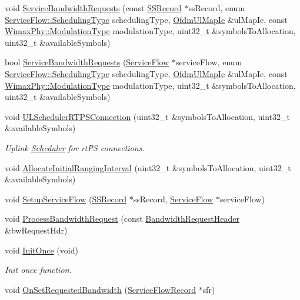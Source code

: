 \begin{DoxyCompactItemize}
\item 
void \hyperlink{classns3_1_1UplinkSchedulerRtps_a35d16645e1db685e5df2b5fc7527f5de}{Service\+Bandwidth\+Requests} (const \hyperlink{classns3_1_1SSRecord}{S\+S\+Record} $\ast$ss\+Record, enum \hyperlink{classns3_1_1ServiceFlow_a7990ba10be1e098328fd1e6382a26235}{Service\+Flow\+::\+Scheduling\+Type} scheduling\+Type, \hyperlink{classns3_1_1OfdmUlMapIe}{Ofdm\+Ul\+Map\+Ie} \&ul\+Map\+Ie, const \hyperlink{classns3_1_1WimaxPhy_a044c5d8a48ca992c39c2a946f6e755fa}{Wimax\+Phy\+::\+Modulation\+Type} modulation\+Type, uint32\+\_\+t \&symbols\+To\+Allocation, uint32\+\_\+t \&available\+Symbols)
\item 
bool \hyperlink{classns3_1_1UplinkSchedulerRtps_a0aa40f551a0bf51ca2197ff85190f572}{Service\+Bandwidth\+Requests} (\hyperlink{classns3_1_1ServiceFlow}{Service\+Flow} $\ast$service\+Flow, enum \hyperlink{classns3_1_1ServiceFlow_a7990ba10be1e098328fd1e6382a26235}{Service\+Flow\+::\+Scheduling\+Type} scheduling\+Type, \hyperlink{classns3_1_1OfdmUlMapIe}{Ofdm\+Ul\+Map\+Ie} \&ul\+Map\+Ie, const \hyperlink{classns3_1_1WimaxPhy_a044c5d8a48ca992c39c2a946f6e755fa}{Wimax\+Phy\+::\+Modulation\+Type} modulation\+Type, uint32\+\_\+t \&symbols\+To\+Allocation, uint32\+\_\+t \&available\+Symbols)
\item 
void \hyperlink{classns3_1_1UplinkSchedulerRtps_aee60dd2773cd1404f6efe04373b567ea}{U\+L\+Scheduler\+R\+T\+P\+S\+Connection} (uint32\+\_\+t \&symbols\+To\+Allocation, uint32\+\_\+t \&available\+Symbols)
\begin{DoxyCompactList}\small\item\em Uplink \hyperlink{classns3_1_1Scheduler}{Scheduler} for rt\+PS connections. \end{DoxyCompactList}\item 
void \hyperlink{classns3_1_1UplinkSchedulerRtps_adc340ccabe8e7dcaec455bdfd111d632}{Allocate\+Initial\+Ranging\+Interval} (uint32\+\_\+t \&symbols\+To\+Allocation, uint32\+\_\+t \&available\+Symbols)
\item 
void \hyperlink{classns3_1_1UplinkSchedulerRtps_ac44a9146c9928da245ebcf2c55a5c0d6}{Setup\+Service\+Flow} (\hyperlink{classns3_1_1SSRecord}{S\+S\+Record} $\ast$ss\+Record, \hyperlink{classns3_1_1ServiceFlow}{Service\+Flow} $\ast$service\+Flow)
\item 
void \hyperlink{classns3_1_1UplinkSchedulerRtps_a8acb9d916577dae3c671c3aa67b1ce48}{Process\+Bandwidth\+Request} (const \hyperlink{classns3_1_1BandwidthRequestHeader}{Bandwidth\+Request\+Header} \&bw\+Request\+Hdr)
\item 
void \hyperlink{classns3_1_1UplinkSchedulerRtps_ac712136e3b5f7e856daba25d7a946747}{Init\+Once} (void)
\begin{DoxyCompactList}\small\item\em Init once function. \end{DoxyCompactList}\item 
void \hyperlink{classns3_1_1UplinkSchedulerRtps_ad6e66597b048a59cb95ea3c620b59c2c}{On\+Set\+Requested\+Bandwidth} (\hyperlink{classns3_1_1ServiceFlowRecord}{Service\+Flow\+Record} $\ast$sfr)
\end{DoxyCompactItemize}
